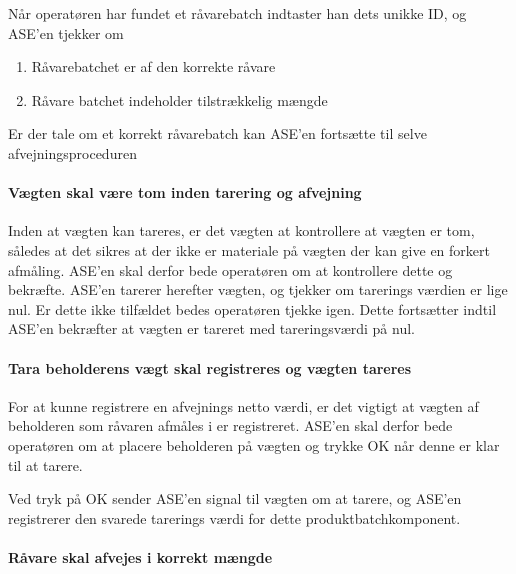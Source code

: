 \documentclass[a4paper]{article}
\begin{document}
Når operatøren har fundet et råvarebatch indtaster han dets unikke ID, og ASE'en tjekker om
\begin{enumerate}
  \item Råvarebatchet er af den korrekte råvare
  \item Råvare batchet indeholder tilstrækkelig mængde
\end{enumerate}

Er der tale om et korrekt råvarebatch kan ASE'en fortsætte til selve afvejningsproceduren


\paragraph{Vægten skal være tom inden tarering og afvejning} %

Inden at vægten kan tareres, er det vægten at kontrollere at vægten er tom, således at det sikres at der ikke er materiale på vægten der kan give en forkert afmåling. ASE'en skal derfor bede operatøren om at kontrollere dette og bekræfte. ASE'en tarerer herefter vægten, og tjekker om tarerings værdien er lige nul. Er dette ikke tilfældet bedes operatøren tjekke igen. Dette fortsætter indtil ASE'en bekræfter at vægten er tareret med tareringsværdi på nul.


\paragraph{Tara beholderens vægt skal registreres og vægten tareres} %

For at kunne registrere en afvejnings netto værdi, er det vigtigt at vægten af beholderen som råvaren afmåles i er registreret. ASE'en skal derfor bede operatøren om at placere beholderen på vægten og trykke OK når denne er klar til at tarere.

Ved tryk på OK sender ASE'en signal til vægten om at tarere, og ASE'en registrerer den svarede tarerings værdi for dette produktbatchkomponent.


\paragraph{Råvare skal afvejes i korrekt mængde} %
\end{document}

